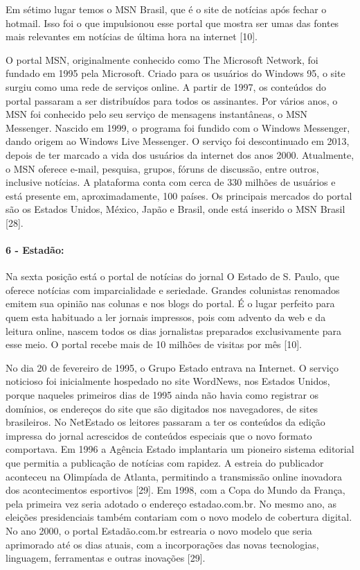 \documentclass[a4paper]{article}
\begin{document}
\begin{titlepage}
Em sétimo lugar temos o MSN Brasil, que é o site de notícias após fechar o hotmail. Isso foi o que impulsionou esse portal que mostra ser umas das fontes mais relevantes em notícias de última hora na internet [10].

O portal MSN, originalmente conhecido como The Microsoft Network, foi fundado em 1995 pela Microsoft. Criado para os usuários do Windows 95, o site surgiu como uma rede de serviços online. A partir de 1997, os conteúdos do portal passaram a ser distribuídos para todos os assinantes. Por vários anos, o MSN foi conhecido pelo seu serviço de mensagens instantâneas, o MSN Messenger. Nascido em 1999, o programa foi fundido com o Windows Messenger, dando origem ao Windows Live Messenger. O serviço foi descontinuado em 2013, depois de ter marcado a vida dos usuários da internet dos anos 2000. Atualmente, o MSN oferece e-mail, pesquisa, grupos, fóruns de discussão, entre outros, inclusive notícias. A plataforma conta com cerca de 330 milhões de usuários e está presente em, aproximadamente, 100 países. Os principais mercados do portal são os Estados Unidos, México, Japão e  Brasil, onde está inserido o MSN Brasil [28].

\paragraph{6 - Estadão: }

Na sexta posição está o portal de notícias do jornal O Estado de S. Paulo, que oferece notícias com imparcialidade e seriedade. Grandes colunistas renomados emitem sua opinião nas colunas e nos blogs do portal. É o lugar perfeito para quem esta habituado a ler jornais impressos, pois com advento da web e da leitura online, nascem todos os dias jornalistas preparados exclusivamente para esse meio. O portal recebe mais de 10 milhões de visitas por mês [10].

No dia 20 de fevereiro de 1995, o Grupo Estado entrava na Internet. O serviço noticioso foi inicialmente hospedado no site WordNews, nos Estados Unidos, porque naqueles primeiros dias de 1995 ainda não havia como registrar os domínios, os endereços do site que são digitados nos navegadores, de sites brasileiros. No NetEstado os leitores passaram a ter os conteúdos da edição impressa do jornal acrescidos de conteúdos especiais que o novo formato comportava. Em 1996 a Agência Estado implantaria um pioneiro sistema editorial que permitia a publicação de notícias com rapidez. A estreia do publicador aconteceu na Olimpíada de Atlanta, permitindo a transmissão online inovadora dos acontecimentos esportivos [29]. Em 1998, com a Copa do Mundo da França, pela primeira vez seria adotado o endereço estadao.com.br. No mesmo ano, as eleições presidenciais também contariam com o novo modelo de cobertura digital. No ano 2000, o portal Estadão.com.br estrearia o novo modelo que seria aprimorado até os dias atuais, com a incorporações das novas tecnologias, linguagem, ferramentas e outras inovações [29].


\end{titlepage}
\end{document}
